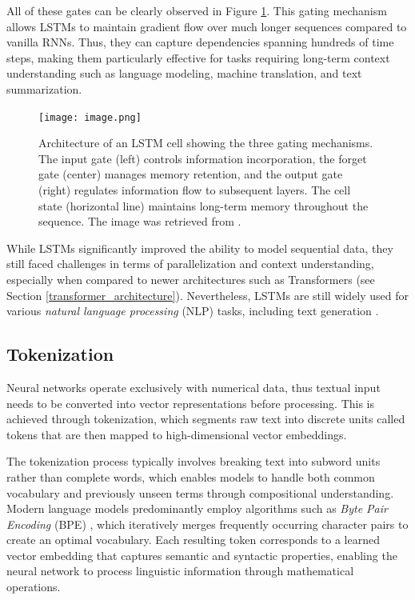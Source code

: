 All of these gates can be clearly observed in Figure \ref{fig:lstm-architecture}. This gating mechanism allows LSTMs to maintain gradient flow over much longer sequences compared to vanilla RNNs. Thus, they can capture dependencies spanning hundreds of time steps, making them particularly effective for tasks requiring long-term context understanding such as language modeling, machine translation, and text summarization.
\begin{figure}[!htbp]
\centering
\texttt{[image: image.png]}
\caption[LSTM Cell Architecture]{Architecture of an LSTM cell showing the three gating mechanisms. The input gate (left) controls information incorporation, the forget gate (center) manages memory retention, and the output gate (right) regulates information flow to subsequent layers. The cell state (horizontal line) maintains long-term memory throughout the sequence. The image was retrieved from \cite{hinton-lstm}.}
\label{fig:lstm-architecture}
\end{figure}

While LSTMs significantly improved the ability to model sequential data, they still faced challenges in terms of parallelization and context understanding, especially when compared to newer architectures such as Transformers (see Section \ref{transformer_architecture}).  Nevertheless, LSTMs are still widely used for various \textit{natural language processing} (NLP) tasks, including text generation \cite{lstm_textgeneration}.

\subsection{Tokenization}

Neural networks operate exclusively with numerical data, thus textual input needs to be converted into vector representations before processing. This is achieved through tokenization, which segments raw text into discrete units called tokens that are then mapped to high-dimensional vector embeddings.

The tokenization process typically involves breaking text into subword units rather than complete words, which enables models to handle both common vocabulary and previously unseen terms through compositional understanding. Modern language models predominantly employ algorithms such as \textit{Byte Pair Encoding} (BPE) \cite{bpe}, which iteratively merges frequently occurring character pairs to create an optimal vocabulary. Each resulting token corresponds to a learned vector embedding that captures semantic and syntactic properties, enabling the neural network to process linguistic information through mathematical operations.


